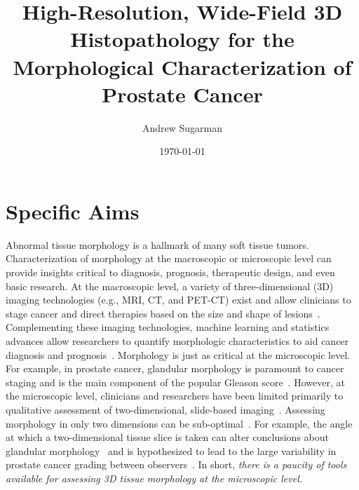 \documentclass{NIHGrant}
\author{Andrew Sugarman}
\date{\today}
\title{High-Resolution, Wide-Field 3D Histopathology for the Morphological Characterization of Prostate Cancer}
\theoremstyle{theorem}
\begin{document}
\maketitle
\newpage
\part*{Specific Aims}

Abnormal tissue morphology is a hallmark of many soft tissue tumors. Characterization of morphology at the macroscopic or microscopic level can provide insights critical to diagnosis, prognosis, therapeutic design, and even basic research. At the macroscopic level, a variety of three-dimensional (3D) imaging technologies (e.g., MRI, CT, and PET-CT) exist and allow clinicians to stage cancer and direct therapies based on the size and shape of lesions~\cite{primakov_automated_2022,katiyar_quantification_2023}. Complementing these imaging technologies, machine learning and statistics advances allow researchers to quantify morphologic characteristics to aid cancer diagnosis and prognosis~\cite{lawson_persistent_2019,crawford_predicting_2020}.
Morphology is just as critical at the microscopic level. For example, in prostate cancer, glandular morphology is paramount to cancer staging and is the main component of the popular Gleason score~\cite{gordetsky_grading_2016,epstein_prostate_2018}. However, at the microscopic level, clinicians and researchers have been limited primarily to qualitative assessment of two-dimensional, slide-based imaging~\cite{liu_harnessing_2021}. Assessing morphology in only two dimensions can be sub-optimal~\cite{ozkan_interobserver_2016,xie_prostate_2022,koyuncu_visual_2023}. For example, the angle at which a two-dimensional tissue slice is taken can alter conclusions about glandular morphology~\cite{serafin_nondestructive_2023} and is hypothesized to lead to the large variability in prostate cancer grading between observers~\cite{serafin_nondestructive_2023,flach_significant_2021}. In short, \emph{there is a paucity of tools available for assessing 3D tissue morphology at the microscopic level.}
\end{document}
